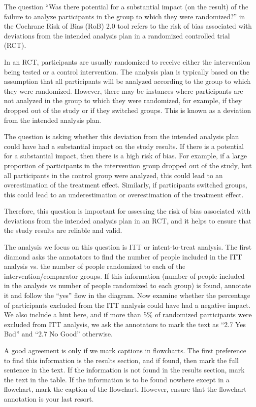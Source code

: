 \documentclass[sn-mathphys,Numbered]{sn-jnl}%
\begin{document}
The question ``Was there potential for a substantial impact (on the result) of the failure to analyze participants in the group to which they were randomized?'' in the Cochrane Risk of Bias (RoB) 2.0 tool refers to the risk of bias associated with deviations from the intended analysis plan in a randomized controlled trial (RCT).

In an RCT, participants are usually randomized to receive either the intervention being tested or a control intervention. The analysis plan is typically based on the assumption that all participants will be analyzed according to the group to which they were randomized. However, there may be instances where participants are not analyzed in the group to which they were randomized, for example, if they dropped out of the study or if they switched groups. This is known as a deviation from the intended analysis plan.

The question is asking whether this deviation from the intended analysis plan could have had a substantial impact on the study results. If there is a potential for a substantial impact, then there is a high risk of bias. For example, if a large proportion of participants in the intervention group dropped out of the study, but all participants in the control group were analyzed, this could lead to an overestimation of the treatment effect. Similarly, if participants switched groups, this could lead to an underestimation or overestimation of the treatment effect.

Therefore, this question is important for assessing the risk of bias associated with deviations from the intended analysis plan in an RCT, and it helps to ensure that the study results are reliable and valid.


The analysis we focus on this question is ITT or intent-to-treat analysis.
The first diamond asks the annotators to find the number of people included in the ITT analysis vs. the number of people randomized to each of the intervention/comparator groups. 
If this information (number of people included in the analysis vs number of people randomized to each group) is found, annotate it and follow the ``yes'' flow in the diagram.
Now examine whether the percentage of participants excluded from the ITT analysis could have had a negative impact.
We also include a hint here, and if more than 5\% of randomized participants were excluded from ITT analysis, we ask the annotators to mark the text as ``2.7 Yes Bad'' and ``2.7 No Good'' otherwise.

A good agreement is only if we mark captions in flowcharts.
The first preference to find this information is the results section, and if found, then mark the full sentence in the text.
If the information is not found in the results section, mark the text in the table.
If the information is to be found nowhere except in a flowchart, mark the caption of the flowchart.
However, ensure that the flowchart annotation is your last resort.
\end{document}

